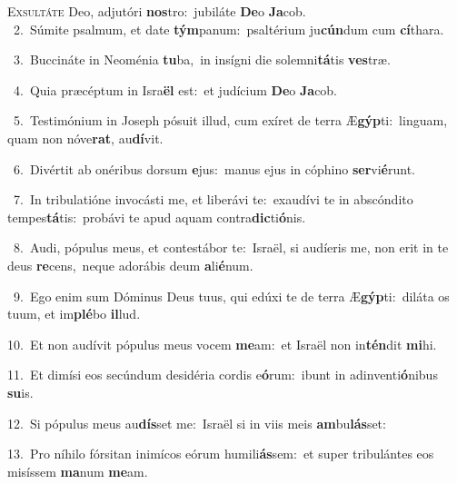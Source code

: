 \lettrine{\initial\textcolor{\initialcolor}{E}}{xsultáte} Deo, adjutóri \textbf{nos}\-tro:~\star jubiláte \textbf{De}\-o \textbf{Ja}\-cob.\\
{\numbfont\textcolor{\numbcolor}{~2.}}~Súmite psalmum, et date \textbf{tým}\-panum:~\star psaltérium ju\-\textbf{cún}\-dum cum \textbf{cí}\-thara.\par
{\numbfont\textcolor{\numbcolor}{~3.}}~Buccináte in Neoménia \textbf{tu}\-ba,~\star in insígni die solemni\-\textbf{tá}\-tis \textbf{ves}\-træ.\par
{\numbfont\textcolor{\numbcolor}{~4.}}~Quia præcéptum in Isra\textbf{ël} est:~\star et judícium \textbf{De}\-o \textbf{Ja}\-cob.\par
{\numbfont\textcolor{\numbcolor}{~5.}}~Testimónium in Joseph pósuit illud, cum exíret de terra Æ\-\textbf{gýp}\-ti:~\star linguam, quam non nóve\-\textbf{rat}\-, au\-\textbf{dí}\-vit.\par
{\numbfont\textcolor{\numbcolor}{~6.}}~Divértit ab onéribus dorsum \textbf{e}\-jus:~\star manus ejus in cóphino \textbf{ser}\-vi\-\textbf{é}\-runt.\par
{\numbfont\textcolor{\numbcolor}{~7.}}~In tribulatióne invocásti me, et liberávi te:~\dagger exaudívi te in abscóndito tempes\-\textbf{tá}\-tis:~\star probávi te apud aquam contra\-\textbf{dic}\-ti\-\textbf{ó}\-nis.\par
{\numbfont\textcolor{\numbcolor}{~8.}}~Audi, pópulus meus, et contestábor te:~\dagger Israël, si audíeris me, non erit in te deus \textbf{re}\-cens,~\star neque adorábis deum \textbf{a}\-li\-\textbf{é}\-num.\par
{\numbfont\textcolor{\numbcolor}{~9.}}~Ego enim sum Dóminus Deus tuus, qui edúxi te de terra Æ\-\textbf{gýp}\-ti:~\star diláta os tuum, et im\-\textbf{plé}\-bo \textbf{il}\-lud.\par
{\numbfont\textcolor{\numbcolor}{10.}}~Et non audívit pópulus meus vocem \textbf{me}\-am:~\star et Israël non in\-\textbf{tén}\-dit \textbf{mi}\-hi.\par
{\numbfont\textcolor{\numbcolor}{11.}}~Et dimísi eos secúndum desidéria cordis e\-\textbf{ó}\-rum:~\star ibunt in adinventi\-\textbf{ó}\-nibus \textbf{su}\-is.\par
{\numbfont\textcolor{\numbcolor}{12.}}~Si pópulus meus au\-\textbf{dís}\-set me:~\star Israël si in viis meis \textbf{am}\-bu\-\textbf{lás}\-set:\par
{\numbfont\textcolor{\numbcolor}{13.}}~Pro níhilo fórsitan inimícos eórum humili\-\textbf{ás}\-sem:~\star et super tribulántes eos misíssem \textbf{ma}\-num \textbf{me}\-am.\par

